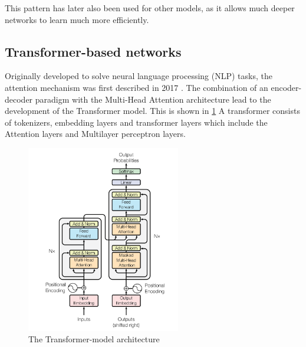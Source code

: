 This pattern has later also been used for other models, as it allows much deeper networks to learn much more efficiently.



\subsection{Transformer-based networks}

Originally developed to solve neural language processing (NLP) tasks, the attention mechanism was first described in 2017 \cite{vaswani_attention_2023}.
The combination of an encoder-decoder paradigm with the Multi-Head Attention architecture lead to the development of the Transformer model. This is shown in \ref{fig:transformer_model}
A transformer consists of tokenizers, embedding layers and transformer layers which include the Attention layers and Multilayer perceptron layers.

\begin{figure}
    \centering
    \includegraphics[width=0.6\textwidth]{Figures/Transformer.png}
    \caption{The Transformer-model architecture \cite{vaswani_attention_2023}}
    \label{fig:transformer_model}
\end{figure}


